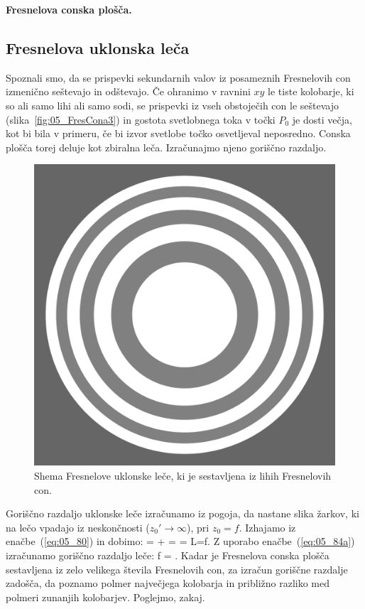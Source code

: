 \begin{example}{\bf Fresnelova conska plošča.}
\subsection*{Fresnelova uklonska leča}
Spoznali smo, da se prispevki sekundarnih valov iz posameznih Fresnelovih con izmenično
seštevajo in odštevajo. Če ohranimo v ravnini $xy$ le tiste kolobarje, ki so ali samo 
lihi ali samo sodi, se prispevki iz vseh obstoječih con le seštevajo (slika~\ref{fig:05_FresCona3}) in
gostota svetlobnega toka v točki $P_0$ je dosti večja, kot bi bila 
v primeru, če bi izvor svetlobe točko osvetljeval neposredno. Conska plošča torej 
deluje kot zbiralna leča. Izračunajmo njeno goriščno razdaljo. 
\begin{figure}[ht]
\centering
\includegraphics[width=40truemm]{slike/05_FresLeca.png}
\caption{Shema Fresnelove uklonske leče, ki je sestavljena iz lihih Fresnelovih con. }
\label{fig:05_lecaFr}
\end{figure}

Goriščno razdaljo uklonske leče izračunamo iz pogoja, da nastane slika 
žarkov, ki na lečo vpadajo iz neskončnosti ($z_0'\to \infty$), pri $z_0 = f$. Izhajamo 
iz enačbe~(\ref{eq:05_80}) in dobimo:
\beq
{} = + =  = \qquad {}\qquad L=f.
\label{eq:05_91}
\eeq
Z uporabo enačbe~(\ref{eq:05_84a}) izračunamo goriščno razdaljo leče:
\beq
f = .
\label{eq:05_92}
\eeq
Kadar je Fresnelova conska plošča sestavljena iz zelo velikega števila Fresnelovih con, za izračun goriščne
razdalje zadošča, da poznamo polmer največjega kolobarja in približno razliko med polmeri zunanjih kolobarjev. Poglejmo, zakaj.


\end{example}
